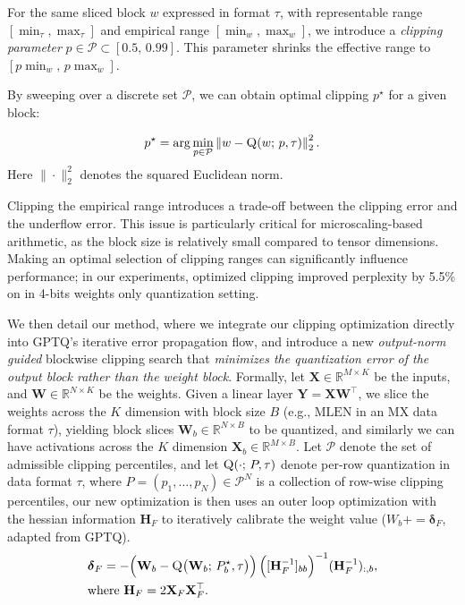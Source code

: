 For the same sliced block $w$ expressed in format $\tau$, with representable range $[\min_{\tau}, \max_{\tau}]$ and empirical range $[\min_{w}, \max_{w}]$, we introduce a \emph{clipping parameter} $p \in \mathcal{P} \subset [0.5,\, 0.99]$. This parameter shrinks the effective range to $[p\min_{w},\, p\max_{w}]$. 


By sweeping over a discrete set $\mathcal{P}$, we can obtain optimal clipping $p^\star$ for a given block:

\begin{equation}
\label{eq:rowwise-argmin}
p^\star
= \arg\min_{p \in \mathcal{P}}
\left\|
w
- \textsc{Q}(w;\, p, \tau)
\right\|_2^2 .
\end{equation}
Here $\|\cdot\|_2^2$ denotes the squared Euclidean norm.



\label{subsec:weights_quant}
Clipping the empirical range introduces a trade-off between the clipping error and the underflow error. This issue is particularly critical for microscaling-based arithmetic, as the block size is relatively small compared to tensor dimensions. Making an optimal selection of clipping ranges can significantly influence performance; in our experiments, optimized clipping improved perplexity by 5.5\% on \llamaIIISmall{} in 4-bits weights only quantization setting.

We then detail our method, where we integrate our clipping optimization directly into GPTQ's iterative error propagation flow, and introduce a new \emph{output-norm guided} blockwise clipping search that \emph{minimizes the quantization error of the output block rather than the weight block}.
Formally, let $\mathbf{X} \in \mathbb{R}^{M \times K}$ be the inputs, and $\mathbf{W} \in \mathbb{R}^{N \times K}$ be the weights. 
Given a linear layer $\mathbf{Y} = \mathbf{X} \mathbf{W}^\top$, we slice the weights across the $K$ dimension with block size $B$ (e.g., $\text{MLEN}$ in an MX data format $\tau$), yielding block slices $\mathbf{W}_b \in \mathbb{R}^{N \times B}$ to be quantized, and similarly we can have activations across the $K$ dimension $\mathbf{X}_b \in \mathbb{R}^{M \times B}$.
Let $\mathcal{P}$ denote the set of admissible clipping percentiles, and let $\textsc{Q}(\cdot;\,P,\tau)$ denote per-row quantization in data format $\tau$, where $P = (p_1,\dots,p_N) \in \mathcal{P}^N$ is a collection of row-wise clipping percentiles, our new optimization is then uses an outer loop optimization with the hessian information $\mathbf{H}_F$ to iteratively calibrate the weight value ($W_b += \boldsymbol{\delta}_F$, adapted from GPTQ). 
\begin{equation}
\label{eq:dual-optimization-description}
\begin{aligned}
& \boldsymbol{\delta}_F =
-\Big(\mathbf{W}_b - \textsc{Q}\big(\mathbf{W}_{b};\,P_b^\star,\tau\big)\Big)\,
\Big([\mathbf{H}_F^{-1}]_{bb}\Big)^{-1}
(\mathbf{H}_F^{-1})_{:,b}, \\
& \text{where } \mathbf{H}_F = 2\mathbf{X}_F\mathbf{X}_F^\top.
\end{aligned}
\end{equation}

